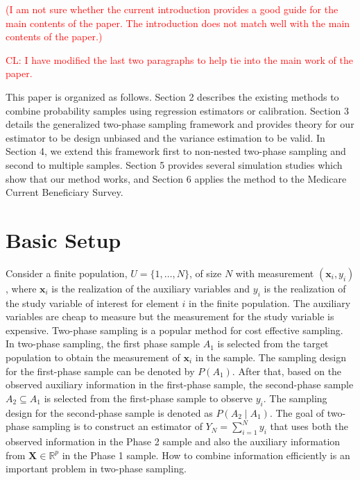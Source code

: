 \documentclass[12pt]{article}
\newcommand{\bx}{\mathbf{x}}
\newcommand{\R}{\mathbb{R}}
\renewcommand{\bf}[1]{\mathbf{#1}}
\begin{document}
\textcolor{red}{(I am not sure whether the current introduction provides a good
  guide for the main contents of the paper. The introduction does not match
  well with the main contents of the paper.)
}

\textcolor{red}{CL: I have modified the last two paragraphs to help tie into the
main work of the paper.}

This paper is organized as follows. 
Section 2 describes the existing methods to combine probability samples using
regression estimators or calibration.
Section 3 details the generalized
two-phase sampling framework and provides theory for our estimator to be design
unbiased and the variance estimation to be valid. In Section 4, we extend this
framework first to non-nested two-phase sampling and second to multiple
samples. Section 5 provides several simulation studies which show that our
method works, and Section 6 applies the method to the Medicare Current
Beneficiary Survey. 

\newpage 

\section{Basic Setup}

Consider a finite population, $U = \{1, \dots, N\}$, of size $N$ 
with measurement  $(\bx_i, y_i)$, where $\bx_i$ is the realization of the
auxiliary variables and $y_i$ is the realization of the study variable of
interest for element  $i$ in the finite population. The auxiliary variables are
cheap to measure but the measurement for the study variable is expensive.
Two-phase sampling is a popular method for cost effective sampling.
In two-phase sampling, the first phase sample $A_1$  is selected from the
target population to obtain the measurement of $\bx_i$ in the sample. The
sampling design for the first-phase sample can be denoted by $P(A_1)$. After
that, based on the observed auxiliary information in the first-phase  sample,
the second-phase sample $A_2 \subseteq A_1$ is selected from the first-phase
sample to observe $y_i$. The sampling design for the second-phase sample is
denoted as $P( A_2 \mid A_1)$.  
The
goal of two-phase sampling is to construct an estimator of $Y_N =  \sum_{i=1}^N y_i$ 
that uses both the observed information in the Phase 2 sample and also the 
auxiliary information from $\bf X \in \R^p$ in the Phase 1 sample. How to
combine information efficiently is an important problem in two-phase sampling. 
\end{document}
